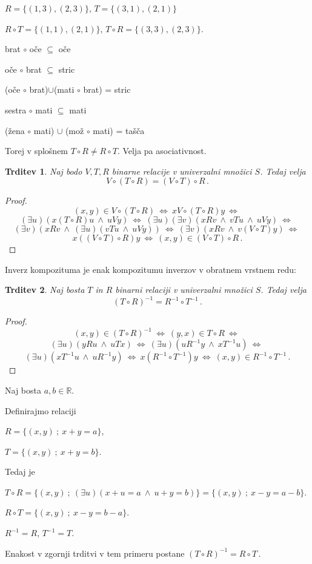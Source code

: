 \documentclass[11pt,paper=b5,footinclude,headinclude]{scrbook} %
\newcounter{example}
\def\inn {{~\wedge~}}
\def\cee {{~\Leftrightarrow~}}
\newtheorem*{trditev}{Trditev}
\begin{document}
\bigskip
\begin{example*}

$R = \{(1,3),(2,3)\}$, $T = \{(3,1), (2,1)\}$

$R\circ T = \{(1,1), (2,1)\}$, 
$T\circ R = \{(3,3),(2,3)\}$.

\medskip

brat $\circ$ oče $\subseteq$ oče

oče  $\circ$ brat $\subseteq$ stric

(oče $\circ$ brat)$\cup$(mati $\circ$ brat) = stric

sestra $\circ$ mati $\subseteq$  mati

(žena $\circ$ mati) $\cup$ (mož $\circ$ mati) = tašča
\end{example*}

\medskip
Torej v splošnem $T\circ R\neq R\circ T$. Velja pa asociativnost.


\begin{trditev}
Naj bodo $V, T, R$ binarne relacije v univerzalni množici $S$. Tedaj velja
$$V\circ(T\circ R) = (V\circ T)\circ R\,.$$
\end{trditev}

\begin{proof}
$$(x,y)\in V\circ(T\circ R)\cee x V\circ(T\circ R) y
\cee$$
$$(\exists u)(x(T\circ R)u\inn uVy)
\cee (\exists u)(\exists v)(xRv\inn vTu\inn uVy)\cee $$
$$(\exists v)(xRv\inn (\exists u)(vTu\inn uVy))
\cee(\exists v)(xRv\inn v(V\circ T)y)\cee$$
$$x ((V\circ T)\circ R)y \cee (x,y)\in (V\circ T)\circ R\,.$$
\end{proof}

Inverz kompozituma je enak kompozitumu inverzov v obratnem vrstnem redu:

\begin{trditev}
Naj bosta $T$ in $R$ binarni relaciji v univerzalni množici $S$. Tedaj velja
$$(T\circ R)^{-1} = R^{-1}\circ T^{-1}\,.$$
\end{trditev}

\begin{proof}
$$(x,y)\in (T\circ R)^{-1} \cee (y,x)\in T\circ R
\cee$$
$$(\exists u)(yRu\inn uTx)
\cee (\exists u)(uR^{-1}y\inn xT^{-1}u)
\cee$$
$$(\exists u)(xT^{-1}u\inn uR^{-1}y)
\cee x (R^{-1}\circ T^{-1}) y\cee (x,y)\in R^{-1}\circ T^{-1}\,.$$
\end{proof}


\bigskip
\begin{example*}

Naj bosta $a,b\in\mathbb{R}$.

Definirajmo relaciji

$R = \{(x,y)~;~x+y = a\}$,

$T = \{(x,y)~;~x+y = b\}$.

Tedaj je

$T\circ R = \{(x,y)~;~(\exists u)(x+u = a\inn u+y = b)\}=\{(x,y)~;~x-y = a-b\}$.

$R\circ T = \{(x,y)~;~x-y = b-a\}$.

$R^{-1}= R$, $T^{-1} = T$.

Enakost v zgornji trditvi v tem primeru postane
$(T\circ R)^{-1} = R \circ T\,.$
\end{example*}
\end{document}
